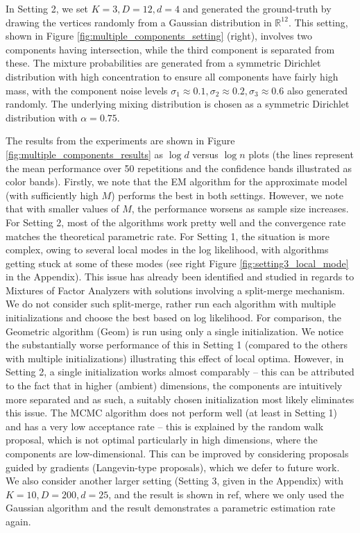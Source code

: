 \documentclass[bj,authoryear]{imsart}
\theoremstyle{plain}
\theoremstyle{remark}
\def\bbR{\mathbb{R}}
\begin{document}
In Setting 2, we set $K=3, D=12, d=4$ and generated the ground-truth by drawing the vertices randomly from a Gaussian distribution in $\bbR^{12}$. This setting, shown in Figure \ref{fig:multiple_components_setting} (right), involves two components having intersection, while the third component is separated from these. The mixture probabilities are generated from a symmetric Dirichlet distribution with high concentration to ensure all components have fairly high mass, with the component noise levels $\sigma_1\approx 0.1, \sigma_2\approx 0.2, \sigma_3\approx 0.6$ also generated randomly. The underlying mixing distribution is chosen as a symmetric Dirichlet distribution with $\alpha=0.75$.

The results from the experiments are shown in Figure \ref{fig:multiple_components_results} as $\log d$ versus $\log n$ plots (the lines represent the mean performance over 50 repetitions and the confidence bands illustrated as color bands). Firstly, we note that the EM algorithm for the approximate model (with sufficiently high $M$) performs the best in both settings. However, we note that with smaller values of $M$, the performance worsens as sample size increases. For Setting 2, most of the algorithms work pretty well and the convergence rate matches the theoretical parametric rate. For Setting 1, the situation is more complex, owing to several local modes in the log likelihood, with algorithms getting stuck at some of these modes (see right Figure \ref{fig:setting3_local_mode} in the Appendix). This issue has already been identified and studied in regards to Mixtures of Factor Analyzers \cite{ueda2000smem, ghahramani1999variational} with solutions involving a split-merge mechanism. We do not consider such split-merge, rather run each algorithm with multiple initializations and choose the best based on log likelihood. For comparison, the Geometric algorithm (Geom) is run using only a single initialization. We notice the substantially worse performance of this in Setting 1 (compared to the others with multiple initializations) illustrating this effect of local optima. However, in Setting 2, a single initialization works almost comparably -- this can be attributed to the fact that in higher (ambient) dimensions, the components are intuitively more separated and as such, a suitably chosen initialization most likely eliminates this issue. The MCMC algorithm does not perform well (at least in Setting 1) and has a very low acceptance rate -- this is explained by the random walk proposal, which is not optimal particularly in high dimensions, where the components are low-dimensional. This can be improved by considering proposals guided by gradients (Langevin-type proposals), which we defer to future work. We also consider another larger setting (Setting 3, given in the Appendix) with $K=10, D=200, d=25$, and the result is shown in ref, where we only used the Gaussian algorithm and the result demonstrates a parametric estimation rate again.
\end{document}
